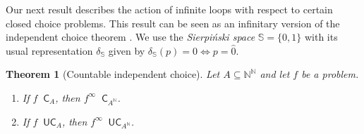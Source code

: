 \documentclass[11pt,a4paper]{amsart}
\theoremstyle{plain}
\newtheorem{thm}{Theorem}[section]
\theoremstyle{definition}
\theoremstyle{defC}
\theoremstyle{thmC}
\theoremstyle{plain}
\numberwithin{equation}{section}
\def\IN{{\mathbb{N}}}
\def\IS{{\mathbb{S}}}
\def\In{\subseteq}
\def\U{{\mathsf{{U}}}}
\def\C{{\mathsf{{C}}}}
\def\C{\mathsf{C}}
\def\leqW{\mathop{\leq_{\mathrm{W}}}}
\def\leqW{\mathop{\leq_{\mathrm{W}}}}
\begin{document}
Our next result describes the action of infinite loops with respect to certain closed choice problems.
This result can be seen as an infinitary version of the independent choice theorem \cite[Theorem~7.2]{BBP12}.
We use the {\em Sierpi\'nski space} $\IS=\{0,1\}$ with its usual representation $\delta_\IS$ given by
$\delta_\IS(p)=0\iff p=\widehat{0}$.

\begin{thm}[Countable independent choice]
\label{thm:independent}
Let $A\In\IN^\IN$ and let $f$ be a problem.
\begin{enumerate}
\item If $f\leqW\C_A$, then $f^\infty\leqW\C_{A^\IN}$.
\item If $f\leqW\U\C_A$, then $f^\infty\leqW\U\C_{A^\IN}$.
\end{enumerate}
\end{thm}
\end{document}
